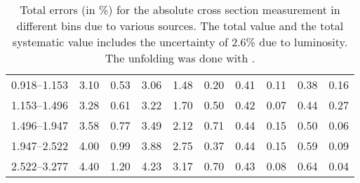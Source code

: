 \begin{table}
\begin{center}
\begin{tabular}{@{}l l l l l l l l l l@{}}
            0.918--1.153     &  3.10   &  0.53   &  3.06         &  1.48      &  0.20    &  0.41  &  0.11       &  0.38  &  0.16  \\
            1.153--1.496     &  3.28   &  0.61   &  3.22         &  1.70      &  0.50    &  0.42  &  0.07       &  0.44  &  0.27  \\
            1.496--1.947     &  3.58   &  0.77   &  3.49         &  2.12      &  0.71    &  0.44  &  0.15       &  0.50  &  0.06  \\
            1.947--2.522     &  4.00   &  0.99   &  3.88         &  2.75      &  0.37    &  0.44  &  0.15       &  0.59  &  0.09  \\
            2.522--3.277     &  4.40   &  1.20   &  4.23         &  3.17      &  0.70    &  0.43  &  0.08       &  0.64  &  0.04  \\
            \bottomrule
        \end{tabular}
    \end{center}
    \caption[
        Total errors (in \%) for the absolute cross section measurement with
        \POWHEG unfolding.
    ]{
        Total errors (in \%) for the absolute cross section measurement in
        different \phistar bins due to various sources. The total value and the
        total systematic value includes the uncertainty of 2.6\% due to
        luminosity. The unfolding was done with \POWHEG.
    }
    \label{tab:sys_uncert_abs_powheg}
\end{table}
